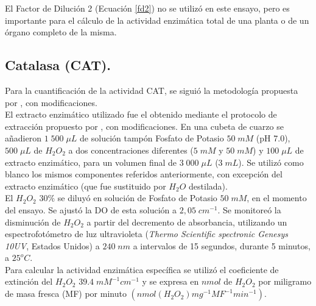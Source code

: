 \medskip
\medskip

El Factor de Diluci\'on 2 (Ecuaci\'on \ref{fd2}) no se utiliz\'o en este ensayo, pero es importante para el c\'alculo de la actividad enzim\'atica total de una planta o de un \'organo completo de la misma.

\subsection{Catalasa (CAT).}

Para la cuantificación de la actividad CAT, se sigui\'o la metodolog\'ia propuesta por \citep{chance1955136}, con modificaciones. \\

El extracto enzim\'atico utilizado fue el obtenido mediante el protocolo de extracci\'on propuesto por \cite{liu2010exogenous}, con modificaciones. En una cubeta de cuarzo se a\~nadieron $1\;500\;{\mu}L$ de soluci\'on tamp\'on Fosfato de Potasio $50\;mM$ (pH 7.0), $500\;{\mu}L$ de $H_2O_2$ a dos concentraciones diferentes ($5\;mM$ y $50\;mM$) y $100\;{\mu}L$ de extracto enzimático, para un volumen final de $3\;000\;{\mu}L$ ($3\;mL$). Se utiliz\'o como blanco los mismos componentes referidos anteriormente, con excepción del extracto enzimático (que fue sustituido por $H_2O$ destilada). \\

El $H_2O_2$ $30\%$ se diluy\'o en soluci\'on de Fosfato de Potasio $50\;mM$, en el momento del ensayo. Se ajust\'o la DO de esta solución a $2,05\;cm^{-1}$. Se monitore\'o la disminución de  $H_2O_2$ a partir del decremento de absorbancia, utilizando un espectrofotómetro de luz ultravioleta (\textit{Thermo Scientific spectronic Genesys 10UV}, Estados Unidos) a $240\;nm$ a intervalos de 15 segundos, durante 5 minutos, a $25^oC$. \\

Para calcular la actividad enzimática espec\'ifica se utiliz\'o el coeficiente de extinción del  $H_2O_2$ $39.4\;mM^{-1}cm^{-1}$ y se expresa en $nmol$ de $H_2O_2$ por miligramo de masa fresca (MF) por minuto $(nmol (H_2O_2)mg^{-1}MF^{-1}min^{-1})$.


